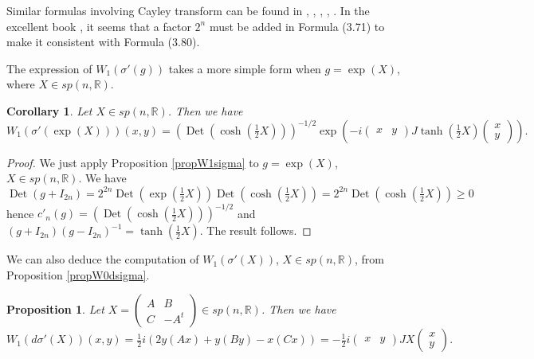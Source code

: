 \documentclass[12pt]{amsart}
\numberwithin{equation}{section}
\newtheorem{corollary}[theorem]{Corollary}
\newtheorem{proposition}[theorem]{Proposition}
\DeclareMathOperator{\Det}{Det} \DeclareMathOperator{\Tr}{Tr}
\begin{document}
Similar formulas involving Cayley transform can be found in \cite{CR1}, \cite{CR2}, \cite{Hil}, \cite{Gos}, \cite{Der1}. In the excellent book \cite{CR1}, it seems that a factor $2^n$ must be
added in Formula (3.71) to make it consistent with Formula (3.80).


The expression of $W_1(\sigma'(g))$ takes a more simple form when $g=\exp(X)$, where
$X\in sp(n,{\mathbb R})$.

\begin{corollary} \label{corW1exp} Let $X\in sp(n,{\mathbb R})$. Then we have 
\begin{equation*}W_1(\sigma'(\exp(X)))(x,y)=(\Det(\cosh (\tfrac{1}{2}X)))^{-1/2}
\exp \left(-i\begin{pmatrix}x&y\end{pmatrix}J\tanh(\tfrac{1}{2}X)
\begin{pmatrix}x\\y\end{pmatrix}\right).
\end{equation*}
\end{corollary}

\begin{proof} We just apply Proposition \ref{propW1sigma} to $g=\exp(X)$, 
$X\in sp(n,{\mathbb R})$. We have 
\begin{equation*}\Det(g+I_{2n})=2^{2n}\Det(\exp (\tfrac{1}{2}X))
\Det(\cosh (\tfrac{1}{2}X))
=2^{2n}\Det(\cosh (\tfrac{1}{2}X))\geq 0 \end{equation*} hence
$c'_n(g)=(\Det(\cosh (\tfrac{1}{2}X)))^{-1/2}$ and 
$(g+I_{2n})(g-I_{2n})^{-1}=\tanh(\tfrac{1}{2}X)$. The result follows.
\end{proof}

We can also deduce the computation of $W_1(\sigma'(X))$, $X\in sp(n,{\mathbb R})$,
from Proposition \ref{propW0dsigma}.

\begin{proposition}\label{propW1dsigma} Let $X=\left(\begin{smallmatrix} A&B\\
C&-A^t\end{smallmatrix}\right)\in sp(n,{\mathbb R})$. Then we have
\begin{equation*}W_1(d\sigma'(X))(x,y)=\tfrac{1}{2}i(2y(Ax)+y(By)-x(Cx))=
-\tfrac{1}{2}i\begin{pmatrix}x&y\end{pmatrix}JX\begin{pmatrix}x\\y\end{pmatrix}.
\end{equation*}
\end{proposition}
\end{document}
